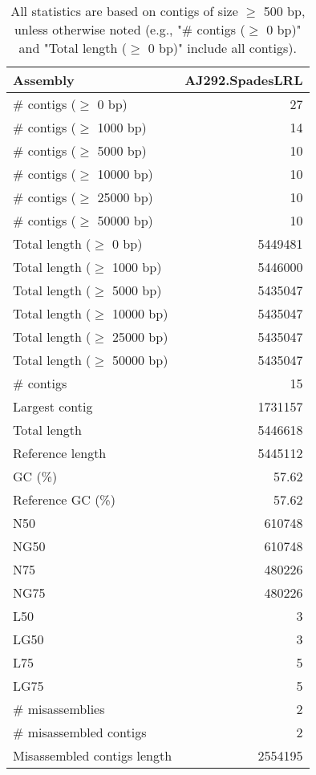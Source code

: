 \documentclass[12pt,a4paper]{article}
\begin{document}
\begin{table}[ht]
\begin{center}
\caption{All statistics are based on contigs of size $\geq$ 500 bp, unless otherwise noted (e.g., "\# contigs ($\geq$ 0 bp)" and "Total length ($\geq$ 0 bp)" include all contigs).}
\begin{tabular}{|l*{1}{|r}|}
\hline
Assembly & AJ292.SpadesLRL \\ \hline
\# contigs ($\geq$ 0 bp) & 27 \\ \hline
\# contigs ($\geq$ 1000 bp) & 14 \\ \hline
\# contigs ($\geq$ 5000 bp) & 10 \\ \hline
\# contigs ($\geq$ 10000 bp) & 10 \\ \hline
\# contigs ($\geq$ 25000 bp) & 10 \\ \hline
\# contigs ($\geq$ 50000 bp) & 10 \\ \hline
Total length ($\geq$ 0 bp) & 5449481 \\ \hline
Total length ($\geq$ 1000 bp) & 5446000 \\ \hline
Total length ($\geq$ 5000 bp) & 5435047 \\ \hline
Total length ($\geq$ 10000 bp) & 5435047 \\ \hline
Total length ($\geq$ 25000 bp) & 5435047 \\ \hline
Total length ($\geq$ 50000 bp) & 5435047 \\ \hline
\# contigs & 15 \\ \hline
Largest contig & 1731157 \\ \hline
Total length & 5446618 \\ \hline
Reference length & 5445112 \\ \hline
GC (\%) & 57.62 \\ \hline
Reference GC (\%) & 57.62 \\ \hline
N50 & 610748 \\ \hline
NG50 & 610748 \\ \hline
N75 & 480226 \\ \hline
NG75 & 480226 \\ \hline
L50 & 3 \\ \hline
LG50 & 3 \\ \hline
L75 & 5 \\ \hline
LG75 & 5 \\ \hline
\# misassemblies & 2 \\ \hline
\# misassembled contigs & 2 \\ \hline
Misassembled contigs length & 2554195 \\ \hline

\end{tabular}
\end{center}
\end{table}
\end{document}
